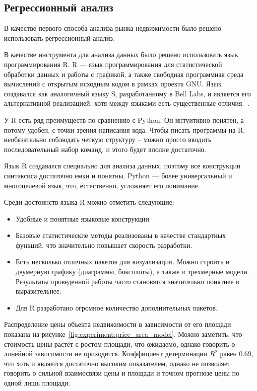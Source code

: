  
\subsection{Регрессионный анализ}
\label{sec:experiment:regression}


В качестве первого способа анализа рынка недвижимости было решено использовать регрессионный анализ.

В качестве инструмента для анализа данных было решено использовать язык программирования R. R — язык программирования
для статистической обработки данных и работы с графикой, а также свободная программная среда вычислений с открытым
исходным кодом в рамках проекта GNU. Язык создавался как аналогичный языку S, разработанному в Bell Labs, и является
его альтернативной реализацией, хотя между языками есть существенные отличия.~\cite{r_lang}.

У R есть ряд преимуществ по сравнению с Python. Он интуитивно понятен, а потому удобен,
с точки зрения написания кода. Чтобы писать программы на R, необязательно соблюдать четкую структуру – можно просто
вводить последовательный набор команд, и этого будет вполне достаточно.

Язык R создавался специально для анализа данных, поэтому все конструкции синтаксиса достаточно емки и понятны.
Python — более универсальный и многоцелевой язык, что, естественно, усложняет его понимание.

Среди достоинств языка R можно отметить следующие:
\begin{itemize}
  \item Удобные и понятные языковые конструкции
  \item Базовые статистические методы реализованы в качестве стандартных функций, что значительно повышает скорость разработки.
  \item Есть несколько отличных пакетов для визуализации. Можно строить и двумерную графику (диаграммы, боксплоты), а также и трехмерные модели. Результаты проведенной работы часто становятся значительно понятнее и выразительнее.
  \item Для R разработано огромное количество дополнительных пакетов.
\end{itemize}

Распределение цены объекта недвижимости в зависимости от его площади показана на рисунке~\ref{fig:experiment:price_area_model}.
Можно заметить, что стоимость цены растёт с ростом площади, что ожидаемо, однако говорить о линейной зависимости не приходится.
Коэффициент детерминации $R^2$ равен 0.69, что хоть и является достаточно высоким показателем, однако
не позволяет говорить о сильной взаимосвязи цены и площади и точном прогнозе цены по одной лишь площади.

